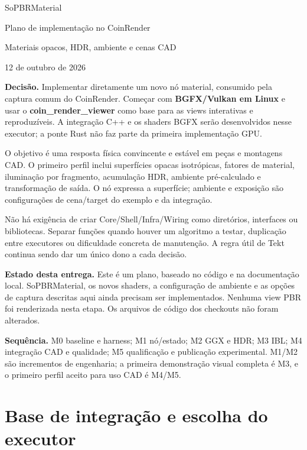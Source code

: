 \documentclass[11pt,a4paper]{article}
\begin{document}
\begin{center}
{\sffamily\color{ink}\Huge SoPBRMaterial}\par\vspace{4mm}
{\sffamily\Large Plano de implementação no CoinRender}\par\vspace{3mm}
{\large Materiais opacos, HDR, ambiente e cenas CAD}\par\vspace{3mm}
{\small 12 de outubro de 2026}
\end{center}

\textbf{Decisão.} Implementar diretamente um novo nó material, consumido pela captura comum do CoinRender. Começar com \textbf{BGFX/Vulkan em Linux} e usar o \textbf{coin\_render\_viewer} como base para as views interativas e reproduzíveis. A integração C++ e os shaders BGFX serão desenvolvidos nesse executor; a ponte Rust não faz parte da primeira implementação GPU.

O objetivo é uma resposta física convincente e estável em peças e montagens CAD. O primeiro perfil inclui superfícies opacas isotrópicas, fatores de material, iluminação por fragmento, acumulação HDR, ambiente pré-calculado e transformação de saída. O nó expressa a superfície; ambiente e exposição são configurações de cena/target do exemplo e da integração.

Não há exigência de criar Core/Shell/Infra/Wiring como diretórios, interfaces ou bibliotecas. Separar funções quando houver um algoritmo a testar, duplicação entre executores ou dificuldade concreta de manutenção. A regra útil de Tekt continua sendo dar um único dono a cada decisão.

\textbf{Estado desta entrega.} Este é um plano, baseado no código e na documentação local. SoPBRMaterial, os novos shaders, a configuração de ambiente e as opções de captura descritas aqui ainda precisam ser implementados. Nenhuma view PBR foi renderizada nesta etapa. Os arquivos de código dos checkouts não foram alterados.

\textbf{Sequência.} M0 baseline e harness; M1 nó/estado; M2 GGX e HDR; M3 IBL; M4 integração CAD e qualidade; M5 qualificação e publicação experimental. M1/M2 são incrementos de engenharia; a primeira demonstração visual completa é M3, e o primeiro perfil aceito para uso CAD é M4/M5.

\newpage\tableofcontents\newpage

\section{Base de integração e escolha do executor}
\end{document}
